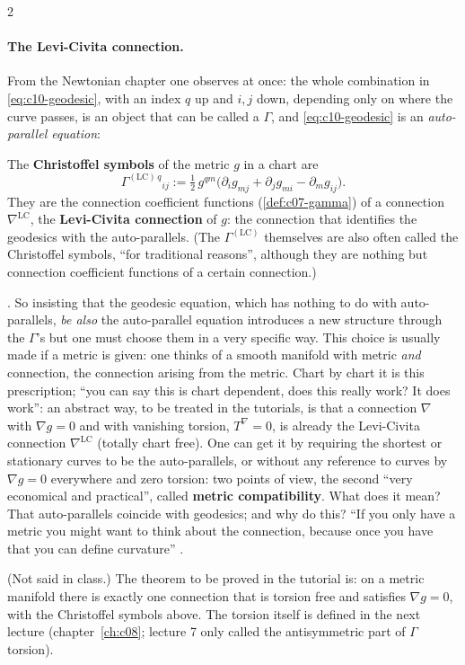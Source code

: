 \begin{paracol}{2}
\paragraph{The Levi-Civita connection.} From the Newtonian chapter one observes at once: the whole combination in \cref{eq:c10-geodesic}, with an index $q$ up and $i,j$ down, depending only on where the curve passes, is an object that can be called a $\Gamma$, and \cref{eq:c10-geodesic} is an \emph{auto-parallel equation}:
\begin{definition}\label{def:c10-lc}
The \textbf{Christoffel symbols} of the metric $g$ in a chart are
\[
  \Gamma^{(\mathrm{LC})\,q}{}_{ij}:=\tfrac12\,g^{qm}\bigl(\partial_ig_{mj}+\partial_jg_{mi}-\partial_mg_{ij}\bigr).
\]
They are the connection coefficient functions (\cref{def:c07-gamma}) of a connection $\nabla^{\mathrm{LC}}$, the \textbf{Levi-Civita connection} of $g$: the connection that identifies the geodesics with the auto-parallels. (The $\Gamma^{(\mathrm{LC})}$ themselves are also often called the Christoffel symbols, ``for traditional reasons'', although they are nothing but connection coefficient functions of a certain connection.)
\end{definition}
.
So insisting that the geodesic equation, which has nothing to do with auto-parallels, \emph{be also} the auto-parallel equation introduces a new structure through the $\Gamma$'s but one must choose them in a very specific way. This choice is usually made if a metric is given: one thinks of a smooth manifold with metric \emph{and} connection, the connection arising from the metric. Chart by chart it is this prescription; ``you can say this is chart dependent, does this really work? It does work'': an abstract way, to be treated in the tutorials, is that a connection $\nabla$ with $\nabla g=0$ and with vanishing torsion, $T^\nabla=0$, is already the Levi-Civita connection $\nabla^{\mathrm{LC}}$ (totally chart free). One can get it by requiring the shortest or stationary curves to be the auto-parallels, or without any reference to curves by $\nabla g=0$ everywhere and zero torsion: two points of view, the second ``very economical and practical'', called \textbf{metric compatibility}. What does it mean? That auto-parallels coincide with geodesics; and why do this? ``If you only have a metric you might want to think about the connection, because once you have that you can define curvature''
.
\begin{coursenote}
(Not said in class.) The theorem to be proved in the tutorial is: on a metric manifold there is exactly one connection that is torsion free and satisfies $\nabla g=0$, with the Christoffel symbols above. The torsion itself is defined in the next lecture (chapter~\ref{ch:c08}; lecture 7 only called the antisymmetric part of $\Gamma$ torsion).
\end{coursenote}


\end{paracol}

